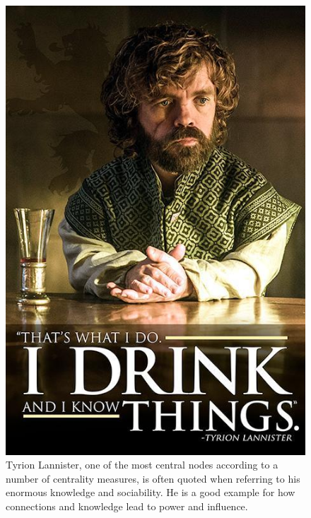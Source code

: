 \begin{figure}
    \centering
    \includegraphics[scale=0.2]{tyrion.jpeg}
    \caption{Tyrion Lannister, one of the most central nodes according to a number of centrality measures, is often quoted when referring to his enormous knowledge and sociability. He is a good example for how connections and knowledge lead to power and influence.}
    \label{fig:tyrion}
\end{figure}
